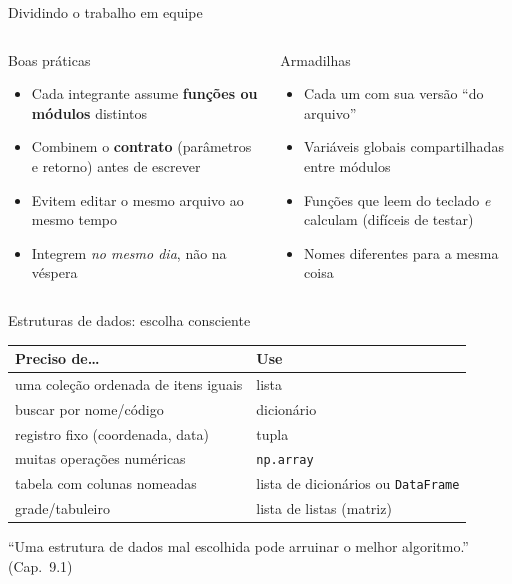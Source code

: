 \documentclass[aspectratio=169,10pt,t]{beamer}
\begin{document}
\begin{frame}{Dividindo o trabalho em equipe}
  \begin{columns}[T]
    \begin{block}{Boas práticas}
      \begin{itemize}\small
        \item Cada integrante assume \textbf{funções ou módulos} distintos
        \item Combinem o \textbf{contrato} (parâmetros e retorno) antes de escrever
        \item Evitem editar o mesmo arquivo ao mesmo tempo
        \item Integrem \emph{no mesmo dia}, não na véspera
      \end{itemize}
    \end{block}
    \begin{alertblock}{Armadilhas}
      \begin{itemize}\small
        \item Cada um com sua versão ``do arquivo''
        \item Variáveis globais compartilhadas entre módulos
        \item Funções que leem do teclado \emph{e} calculam (difíceis de testar)
        \item Nomes diferentes para a mesma coisa
      \end{itemize}
    \end{alertblock}
  \end{columns}
\end{frame}

\begin{frame}{Estruturas de dados: escolha consciente}
  \centering\small
  \begin{tabular}{p{4.6cm}p{6.6cm}}
    \toprule
    \textbf{Preciso de\ldots} & \textbf{Use}\\
    \midrule
    uma coleção ordenada de itens iguais & lista\\
    buscar por nome/código & dicionário\\
    registro fixo (coordenada, data) & tupla\\
    muitas operações numéricas & \texttt{np.array}\\
    tabela com colunas nomeadas & lista de dicionários ou \texttt{DataFrame}\\
    grade/tabuleiro & lista de listas (matriz)\\
    \bottomrule
  \end{tabular}
  \vspace{1ex}

  \footnotesize ``Uma estrutura de dados mal escolhida pode arruinar o melhor algoritmo.'' (Cap.~9.1)
\end{frame}
\end{document}
